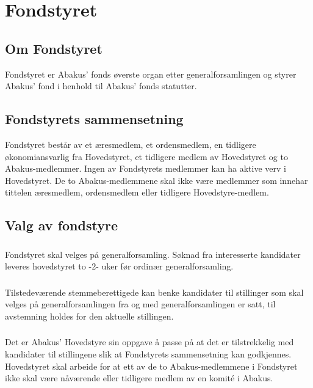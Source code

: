 \section{Fondstyret}
\subsection{Om Fondstyret}
Fondstyret er Abakus’ fonds øverste organ etter generalforsamlingen og styrer
Abakus’ fond i henhold til Abakus’ fonds statutter.

\subsection{Fondstyrets sammensetning}
Fondstyret består av et æresmedlem, et ordensmedlem, en tidligere økonomiansvarlig fra
Hovedstyret, et tidligere medlem av Hovedstyret og to Abakus-medlemmer.
Ingen av Fondstyrets medlemmer kan ha aktive verv i Hovedstyret. De to Abakus-medlemmene
skal ikke være medlemmer som innehar tittelen æresmedlem, ordensmedlem eller tidligere Hovedstyre-medlem.

\subsection{Valg av fondstyre}
\subsubsection{}
Fondstyret skal velges på generalforsamling. Søknad fra interesserte kandidater
leveres hovedstyret to -2- uker før ordinær generalforsamling.

\subsubsection{}
Tilstedeværende stemmeberettigede kan benke kandidater til stillinger som skal velges
på generalforsamlingen fra og med generalforsamlingen er satt, til avstemning holdes for
den aktuelle stillingen.

\subsubsection{}
Det er Abakus’ Hovedstyre sin oppgave å passe på at det er tilstrekkelig med kandidater til
stillingene slik at Fondstyrets sammensetning kan godkjennes. Hovedstyret skal arbeide for
at ett av de to Abakus-medlemmene i Fondstyret ikke skal være nåværende eller tidligere
medlem av en komité i Abakus.

